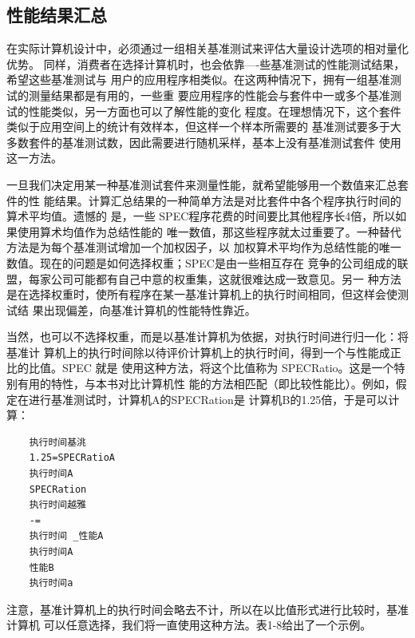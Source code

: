 \subsection{性能结果汇总}
在实际计算机设计中，必须通过一组相关基准测试来评估大量设计选项的相对量化优势。
同样，消费者在选择计算机时，也会依靠—-些基准测试的性能测试结果，希望这些基准测试与
用户的应用程序相类似。在这两种情况下，拥有一组基准测试的测量结果都是有用的，一些重
要应用程序的性能会与套件中一或多个基准测试的性能类似，另一方面也可以了解性能的变化
程度。在理想情况下，这个套件类似于应用空间上的统计有效样本，但这样一个样本所需要的
基准测试要多于大多数套件的基准测试数，因此需要进行随机采样，基本上没有基准测试套件
使用这一方法。

一旦我们决定用某一种基准测试套件来测量性能，就希望能够用一个数值来汇总套件的性
能结果。计算汇总结果的一种简单方法是对比套件中各个程序执行时间的算术平均值。遗憾的
是，一些 SPEC程序花费的时间要比其他程序长4倍，所以如果使用算术均值作为总结性能的
唯一数值，那这些程序就太过重要了。一种替代方法是为每个基准测试增加一个加权因子，以
加权算术平均作为总结性能的唯一数值。现在的问题是如何选择权重；SPEC是由一些相互存在
竞争的公司组成的联盟，每家公司可能都有自己中意的权重集，这就很难达成一致意见。另一
种方法是在选择权重时，使所有程序在某一基准计算机上的执行时间相同，但这样会使测试结
果出现偏差，向基准计算机的性能特性靠近。

当然，也可以不选择权重，而是以基准计算机为依据，对执行时间进行归一化：将基准计
算机上的执行时间除以待评价计算机上的执行时间，得到一个与性能成正比的比值。SPEC 就是
使用这种方法，将这个比值称为 SPECRatio。这是一个特别有用的特性，与本书对比计算机性
能的方法相匹配（即比较性能比）。例如，假定在进行基准测试时，计算机A的SPECRation是
计算机B的1.25倍，于是可以计算：

\begin{verbatim}
    执行时间基洮
    1.25=SPECRatioA
    执行时间A
    SPECRation
    执行时间越雅
    -=
    执行时间 _性能A
    执行时间A
    性能B
    执行时间a
\end{verbatim}

注意，基准计算机上的执行时间会略去不计，所以在以比值形式进行比较时，基准计算机
可以任意选择，我们将一直使用这种方法。表1-8给出了一个示例。

